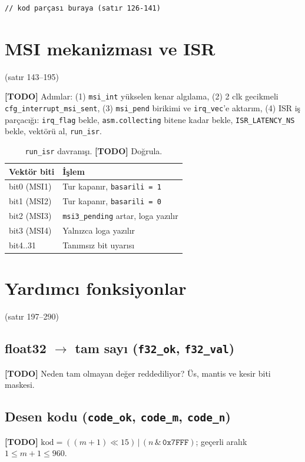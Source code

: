 \documentclass[11pt,a4paper]{article}
\newcommand{\kod}[1]{\texttt{#1}}
\newcommand{\todo}[1]{\textcolor{red!60!black}{\textbf{[TODO]} #1}}
\newcommand{\satir}[1]{\textcolor{black!60}{\scriptsize(satır #1)}}
\begin{document}
\begin{lstlisting}[language={}]
// kod parçası buraya (satır 126-141)
\end{lstlisting}

\section{MSI mekanizması ve ISR}
\satir{143--195}

\todo{Adımlar: (1) \kod{msi\_int} yükselen kenar algılama, (2) 2 clk gecikmeli
\kod{cfg\_interrupt\_msi\_sent}, (3) \kod{msi\_pend} birikimi ve \kod{irq\_vec}'e
aktarım, (4) ISR iş parçacığı: \kod{irq\_flag} bekle, \kod{asm.collecting} bitene
kadar bekle, \kod{ISR\_LATENCY\_NS} bekle, vektörü al, \kod{run\_isr}.}

\begin{table}[h]
\centering
\begin{tabular}{@{}ll@{}}
\toprule
Vektör biti & İşlem \\
\midrule
bit0 (MSI1) & Tur kapanır, \kod{basarili = 1} \\
bit1 (MSI2) & Tur kapanır, \kod{basarili = 0} \\
bit2 (MSI3) & \kod{msi3\_pending} artar, loga yazılır \\
bit3 (MSI4) & Yalnızca loga yazılır \\
bit4..31 & Tanımsız bit uyarısı \\
\bottomrule
\end{tabular}
\caption{\kod{run\_isr} davranışı. \todo{Doğrula.}}
\end{table}

\section{Yardımcı fonksiyonlar}
\satir{197--290}

\subsection{float32 $\to$ tam sayı (\kod{f32\_ok}, \kod{f32\_val})}
\todo{Neden tam olmayan değer reddediliyor? Üs, mantis ve kesir biti maskesi.}

\subsection{Desen kodu (\kod{code\_ok}, \kod{code\_m}, \kod{code\_n})}
\todo{$\mathrm{kod}=((m+1)\ll15)\,|\,(n\,\&\,\mathtt{0x7FFF})$; geçerli aralık
$1\le m+1\le 960$.}
\end{document}
